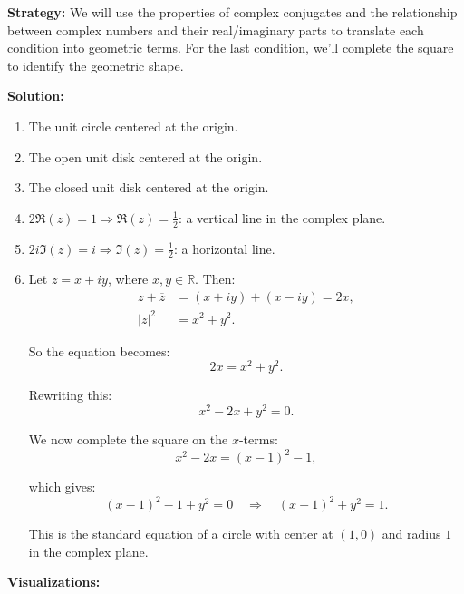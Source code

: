 \noindent\textbf{Strategy:} We will use the properties of complex conjugates and the relationship between complex numbers and their real/imaginary parts to translate each condition into geometric terms. For the last condition, we'll complete the square to identify the geometric shape.

\bigskip\noindent\textbf{Solution:}
\begin{enumerate}[label=\alph*)]
\item The unit circle centered at the origin.
\item The open unit disk centered at the origin.
\item The closed unit disk centered at the origin.
\item \( 2 \Re(z) = 1 \Rightarrow \Re(z) = \frac{1}{2} \): a vertical line in the complex plane.
\item \( 2i \Im(z) = i \Rightarrow \Im(z) = \frac{1}{2} \): a horizontal line.
\item Let \( z = x + iy \), where \( x, y \in \mathbb{R} \). Then:
\begin{align*}
z + \overline{z} &= (x + iy) + (x - iy) = 2x, \\
|z|^2 &= x^2 + y^2.
\end{align*}

So the equation becomes:
\[
2x = x^2 + y^2.
\]

Rewriting this:
\[
x^2 - 2x + y^2 = 0.
\]

We now complete the square on the \( x \)-terms:
\[
x^2 - 2x = (x - 1)^2 - 1,
\]

which gives:
\[
(x - 1)^2 - 1 + y^2 = 0 \quad \Rightarrow \quad (x - 1)^2 + y^2 = 1.
\]

This is the standard equation of a circle with center at \( (1, 0) \) and radius \( 1 \) in the complex plane.

\end{enumerate}

\textbf{Visualizations:}


